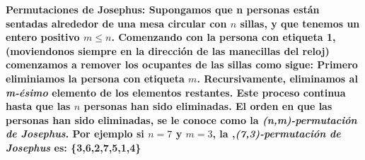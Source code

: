 \textbf{Permutaciones de Josephus: Supongamos que n personas están 
sentadas alrededor de una mesa circular con $n$ sillas, y que tenemos
un entero positivo $m \leq n$. Comenzando con la persona con etiqueta 1, 
(moviendonos siempre en la dirección de las manecillas del reloj) comenzamos
a remover los ocupantes de las sillas como sigue: Primero eliminiamos la persona
con etiqueta $m$. Recursivamente, eliminamos al \textit{m-ésimo} elemento de los
elementos restantes. Este proceso continua hasta que las $n$ personas han sido
eliminadas. El orden en que las personas han sido eliminadas, se le conoce como
la \textit{(n,m)-permutación de Josephus}. Por ejemplo si $n=7$ y $m=3$, la 
,\textit{(7,3)-permutación de Josephus} es: \{3,6,2,7,5,1,4\}}